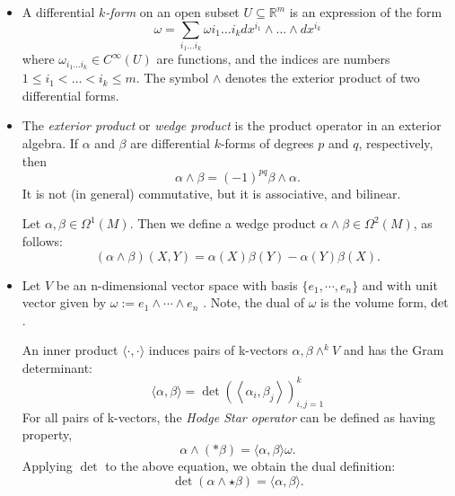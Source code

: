 \documentclass{article}
\theoremstyle{definition}
\begin{document}
        \begin{itemize}
            \item A differential \textit{$k$-form }on an open subset $U \subseteq \mathbb R^m$ is an expression of the form 
            \[
                \omega = \sum_{i_1 \dots i_k} \omega i_1\dots i_k dx^{i_1} \wedge \dots \wedge  dx^{i_k}
            \] 
            where $\omega_{i_1\dots i_k} \in C^\infty(U)$ are functions, and the indices are numbers $1 \leq i_1 < \dots < i_k \leq m$. The symbol $\wedge$ denotes the exterior product of two differential forms.
            
            \item The \textit{exterior product} or \textit{wedge product} is the product operator in an exterior algebra. If $\alpha$ and $\beta$ are differential $k$-forms of degrees $p$ and $q$, respectively, then
            \[
                \alpha \wedge \beta=(-1)^{pq} \beta \wedge \alpha. 	
            \]
            It is not (in general) commutative, but it is associative, and bilinear. 
            
            Let $\alpha, \beta \in \Omega^1(M)$. Then we define a wedge product $\alpha \wedge \beta \in \Omega^2 (M)$, as follows:
            \[
                (\alpha \wedge \beta)(X,Y) = \alpha (X)\beta(Y)-\alpha(Y)\beta(X).
            \]
            
            \item Let $V$ be an n-dimensional vector space with basis $\{ e_1, \cdots, e_n \}$ and with unit vector given by $\omega := e_1 \wedge \cdots \wedge e_n$ . Note, the dual of $\omega$ is the volume form, $\hbox{det}$.
            
            An inner product $\langle \cdot,\cdot \rangle$ induces pairs of k-vectors $\alpha, \beta \wedge^k V$ and has the Gram determinant:
            \[
            {\displaystyle \langle \alpha ,\beta \rangle =\det \left(\left\langle \alpha _{i},\beta _{j}\right\rangle \right)_{i,j=1}^{k}}
            \]
            For all pairs of k-vectors, the \textit{Hodge Star operator} can be defined as having property, 
            \[
                \alpha \wedge (* \beta ) = \langle \alpha, \beta \rangle \omega.
            \]
            Applying ${\displaystyle \det }$ to the above equation, we obtain the dual definition:
            \[
                {\displaystyle \det(\alpha \wedge {\star }\beta )=\langle \alpha ,\beta \rangle .}
            \]
            
        \end{itemize}
    
\end{document}
